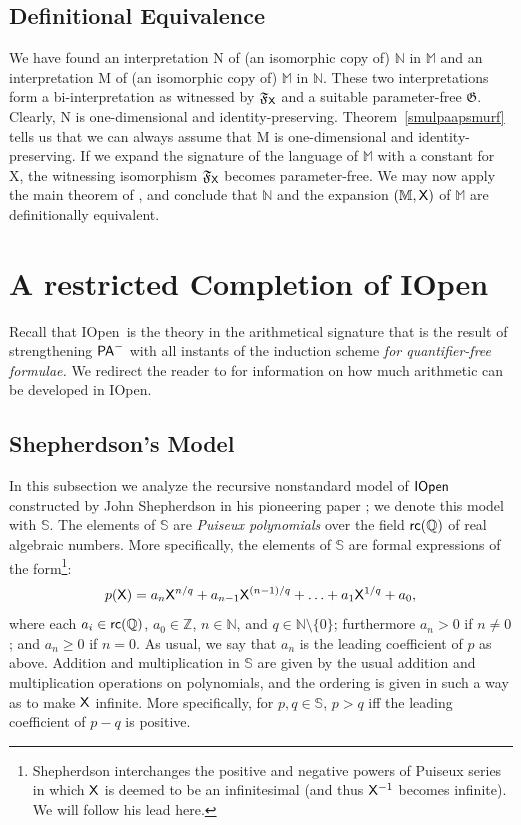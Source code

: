 \documentclass{amsart}
\renewcommand{\geq}{\geqslant}
\newcommand{\mf}[1]{{\mathfrak {#1}}}
\newcommand{\pam}{\ensuremath{{\sf PA}^{-}}}
\newcommand{\X}{{\sf X}}
\newcommand{\iopen}{{\sf IOpen}}
\newcommand{\rc}{{\sf rc}}
\begin{document}
\subsection{Definitional Equivalence}

We have found an interpretation {\sf N} of (an isomorphic copy of) $\mathbb N$ in $\mathbb M$ and an interpretation {\sf M} of
(an isomorphic copy of) $\mathbb M$ in $\mathbb N$. These two interpretations form a bi-interpretation as witnessed by $\mf F_{\sf X}$
and a suitable parameter-free $\mf G$. Clearly, {\sf N} is one-dimensional and identity-preserving. 
Theorem~\ref{smulpaapsmurf} tells us that we can 
always assume that {\sf M} is one-dimensional and identity-preserving. If we expand the signature of the 
language of $\mathbb M$ with
a constant for \X, the witnessing isomorphism $\mf F_\X$ becomes parameter-free. 
We may now apply the main theorem of \cite{viss:biin25}, and conclude that $\mathbb N$ and 
the expansion $(\mathbb M,\X)$ of $\mathbb{M}$ are definitionally equivalent. 

\section{A restricted Completion of \iopen}\label{openitself}
Recall that \iopen\ is the theory in the arithmetical signature that is the result of strengthening $\pam$ with all 
instants of the induction scheme \emph{for quantifier-free formulae.} We redirect the reader to \cite[Chapter I]{haje:meta91} for information on how much arithmetic can be developed in \iopen.

\subsection{Shepherdson's Model}
In this subsection we analyze the recursive nonstandard model of $\iopen$ constructed by John Shepherdson in his pioneering paper \cite{shep:nons64}; we denote this model with $\mathbb{S}$. The elements of $\mathbb{S}$ are \emph{Puiseux polynomials} over the field $\rc(\mathbb{Q})$ of real algebraic numbers. More specifically, the elements of $\mathbb{S}$ are formal expressions of the form\footnote{Shepherdson interchanges the positive and negative
powers of Puiseux series in which $\X$ is deemed to be an infinitesimal (and thus $\X^{-1}$ becomes infinite). We will follow his lead here.}:
    \[p(\X)=a_n\X^{n/q}+a_{n-1}\X^{(n-1)/q} + \ldots + a_1 \X^{1/q} + a_0,\]
where each $a_i \in \rc(\mathbb{Q})$, $a_0\in \mathbb{Z}$, $n\in \mathbb{N}$, and $q\in \mathbb{N}\setminus\{0\}$; furthermore $a_n>0$ if $n\neq 0$; and $a_n\geq 0$ if $n=0$. As usual, we say that $a_n$ is the leading coefficient of $p$ as above. 
Addition and multiplication in $\mathbb{S}$ are given by the usual addition and multiplication operations on polynomials, and the ordering is given in such a way as to make $\X$ infinite. More specifically, for $p, q\in\mathbb{S}$, $p> q$ iff the leading coefficient of $p-q$ is positive. 
\end{document}
